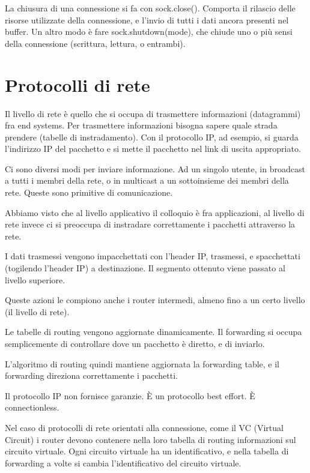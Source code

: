 La chiusura di una connessione si fa con sock.close(). Comporta il rilascio delle risorse utilizzate della connessione, e l'invio di tutti i dati ancora presenti nel buffer. Un altro modo \`e fare sock.shutdown(mode), che chiude uno o pi\`u sensi della connessione (scrittura, lettura, o entrambi).

\section{Protocolli di rete}

Il livello di rete \`e quello che si occupa di trasmettere informazioni (datagrammi) fra end systems. Per trasmettere informazioni bisogna sapere quale strada prendere (tabelle di instradamento). Con il protocollo IP, ad esempio, si guarda l'indirizzo IP del pacchetto e si mette il pacchetto nel link di uscita appropriato.

Ci sono diversi modi per inviare informazione. Ad un singolo utente, in broadcast a tutti i membri della rete, o in multicast a un sottoinsieme dei membri della rete. Queste sono primitive di comunicazione.

Abbiamo visto che al livello applicativo il colloquio \`e fra applicazioni, al livello di rete invece ci si preoccupa di instradare correttamente i pacchetti attraverso la rete.

I dati trasmessi vengono impacchettati con l'header IP, trasmessi, e spacchettati (togilendo l'header IP) a destinazione. Il segmento ottenuto viene passato al livello superiore.

Queste azioni le compiono anche i router intermedi, almeno fino a un certo livello (il livello di rete).

Le tabelle di routing vengono aggiornate dinamicamente. Il forwarding si occupa semplicemente di controllare dove un pacchetto \`e diretto, e di inviarlo.

L'algoritmo di routing quindi mantiene aggiornata la forwarding table, e il forwarding direziona correttamente i pacchetti.

Il protocollo IP non fornisce garanzie. \`E un protocollo best effort. \`E connectionless.

Nel caso di protocolli di rete orientati alla connessione, come il VC (Virtual Circuit) i router devono contenere nella loro tabella di routing informazioni sul circuito virtuale. Ogni circuito virtuale ha un identificativo, e nella tabella di forwarding a volte si cambia l'identificativo del circuito virtuale.

